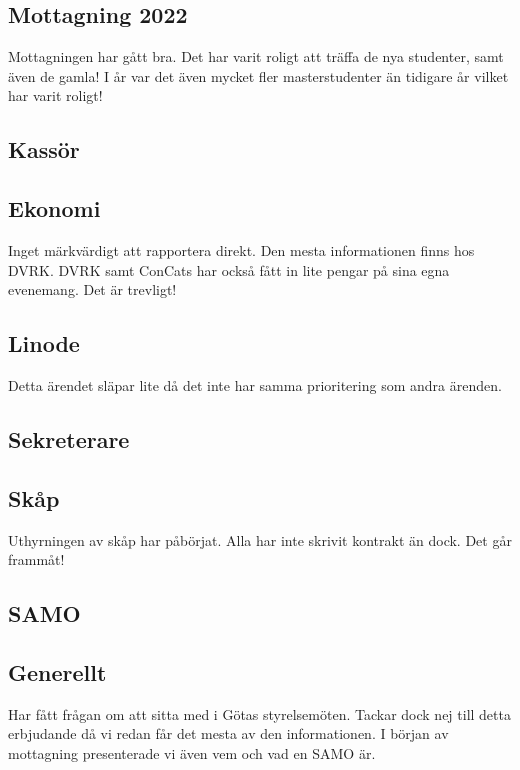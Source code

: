 \documentclass[protokoll]{dvd}
\begin{document}
    \subsection{Mottagning 2022}
    Mottagningen har gått bra. Det har varit roligt att träffa de nya studenter, samt även de gamla!
    I år var det även mycket fler masterstudenter än tidigare år vilket har varit roligt!

\newpage


\subsection{Kassör}
    \subsection{Ekonomi}
    Inget märkvärdigt att rapportera direkt. Den mesta informationen finns hos DVRK.
    DVRK samt ConCats har också fått in lite pengar på sina egna evenemang. Det är trevligt!

    \subsection{Linode}
    Detta ärendet släpar lite då det inte har samma prioritering som andra ärenden.

\subsection{Sekreterare}
    \subsection{Skåp}
    Uthyrningen av skåp har påbörjat. Alla har inte skrivit kontrakt än dock. Det går frammåt!

\subsection{SAMO}
    \subsection{Generellt}
    Har fått frågan om att sitta med i Götas styrelsemöten.
    Tackar dock nej till detta erbjudande då vi redan får det mesta av den informationen.
    I början av mottagning presenterade vi även vem och vad en SAMO är.
\end{document}

